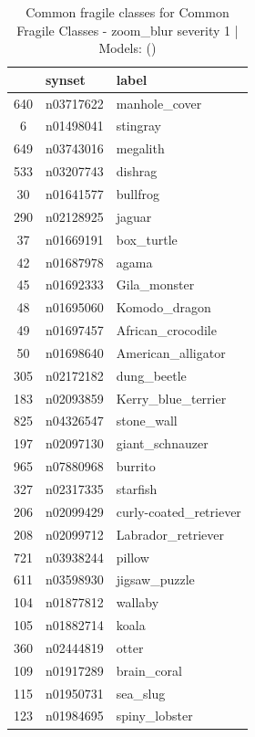 \begin{table}
\caption{Common fragile classes for Common Fragile Classes - zoom_blur severity 1 | Models: ()}
\label{tab:Common Fragile Classes - zoom_blur severity 1_d41d8cd9}
\begin{tabular}{cll}
\toprule
 & synset & label \\
\midrule
640 & n03717622 & manhole_cover \\
6 & n01498041 & stingray \\
649 & n03743016 & megalith \\
533 & n03207743 & dishrag \\
30 & n01641577 & bullfrog \\
290 & n02128925 & jaguar \\
37 & n01669191 & box_turtle \\
42 & n01687978 & agama \\
45 & n01692333 & Gila_monster \\
48 & n01695060 & Komodo_dragon \\
49 & n01697457 & African_crocodile \\
50 & n01698640 & American_alligator \\
305 & n02172182 & dung_beetle \\
183 & n02093859 & Kerry_blue_terrier \\
825 & n04326547 & stone_wall \\
197 & n02097130 & giant_schnauzer \\
965 & n07880968 & burrito \\
327 & n02317335 & starfish \\
206 & n02099429 & curly-coated_retriever \\
208 & n02099712 & Labrador_retriever \\
721 & n03938244 & pillow \\
611 & n03598930 & jigsaw_puzzle \\
104 & n01877812 & wallaby \\
105 & n01882714 & koala \\
360 & n02444819 & otter \\
109 & n01917289 & brain_coral \\
115 & n01950731 & sea_slug \\
123 & n01984695 & spiny_lobster \\
\bottomrule
\end{tabular}
\end{table}
